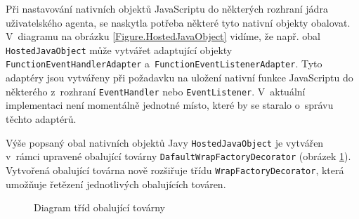 Při nastavování nativních objektů JavaScriptu do některých rozhraní jádra uživatelského agenta, se naskytla potřeba některé tyto nativní objekty obalovat. V~diagramu na obrázku \ref{Figure.HostedJavaObject} vidíme, že např. obal \texttt{HostedJavaObject} může vytvářet adaptující objekty \texttt{FunctionEventHandlerAdapter} a~\texttt{FunctionEventListenerAdapter}. Tyto adaptéry jsou vytvářeny při požadavku na uložení nativní funkce JavaScriptu do některého z~rozhraní \texttt{EventHandler} nebo \texttt{EventListener}. V~aktuální implementaci není momentálně jednotné místo, které by se staralo o~správu těchto adaptérů.

Výše popsaný obal nativních objektů Javy \texttt{HostedJavaObject} je vytvářen v~rámci upravené obalující továrny \texttt{DafaultWrapFactoryDecorator} (obrázek \ref{Figure.WrapFactoryDecorator}). Vytvořená obalující továrna nově rozšiřuje třídu \texttt{WrapFactoryDecorator}, která umožňuje řetězení jednotlivých obalujících továren. 

\begin{figure}[H]
  \begin{center}
    \caption{Diagram tříd obalující továrny}
    \label{Figure.WrapFactoryDecorator}
  \end{center}
\end{figure}

